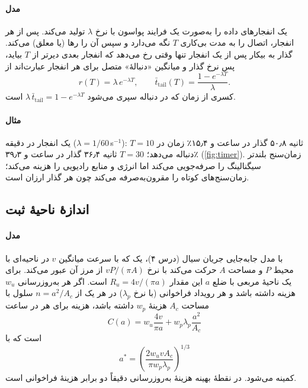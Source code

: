 \documentclass[11pt,a4paper]{article}
\begin{document}
\paragraph{مدل} یک  انفجارهای داده را به‌صورت یک فرایند پواسون با نرخ $\lambda$ تولید می‌کند. پس از هر انفجار،  اتصال را به مدت
بی‌کاری $T$ نگه می‌دارد و سپس آن را رها (یا معلق) می‌کند. گذار به بیکار پس از یک انفجار تنها وقتی رخ می‌دهد که انفجار بعدی دیرتر از $T$ بیاید،
پس نرخ گذار و میانگین «دنبالهٔ» متصل برای هر انفجار عبارت‌اند از
\begin{equation}\label{eq:timer}
  r(T) = \lambda\, e^{-\lambda T}, \qquad \bar{t}_{\mathrm{tail}}(T) = \frac{1 - e^{-\lambda T}}{\lambda} .
\end{equation}
کسری از زمان که در دنباله سپری می‌شود $\lambda\,\bar{t}_{\mathrm{tail}} = 1 - e^{-\lambda T}$ است.
\paragraph{مثال} یک انفجار در دقیقه ($\lambda = 1/60$\,s$^{-1}$): $T = 10$ ثانیه ۵۰٫۸ گذار در ساعت و ۱۵٫۴٪ زمان در دنباله می‌دهد؛ $T = 30$ ثانیه ۳۶٫۴
گذار در ساعت و ۳۹٫۳٪ (\cref{fig:timer}). زمان‌سنج بلندتر سیگنالینگ را صرفه‌جویی می‌کند اما انرژی  و منابع رادیویی را هزینه می‌کند؛
 زمان‌سنج‌های کوتاه را مقرون‌به‌صرفه می‌کند چون هر گذار ارزان است.

\begin{acnfigure}
  \caption{معاوضهٔ زمان‌سنج بی‌کاری برای یک انفجار در دقیقه (\cref{eq:timer}).}
  \label{fig:timer}
\end{acnfigure}

\subsection{اندازهٔ ناحیهٔ ثبت}\label{sec:ra}
\paragraph{مدل} با مدل جابه‌جایی جریان سیال (درس ۴)، یک  که با سرعت میانگین $v$ در ناحیه‌ای با محیط $P$ و مساحت $A$ حرکت می‌کند با نرخ
$vP/(\pi A)$ از مرز آن عبور می‌کند. برای یک ناحیهٔ مربعی با ضلع $a$ این مقدار $R_u = 4v/(\pi a)$ است. اگر هر به‌روزرسانی $w_u$ هزینه داشته باشد و هر
رویداد فراخوانی (با نرخ $\lambda_p$) در هر یک از $n = a^2/A_c$ سلول با مساحت $A_c$ هزینهٔ $w_p$ داشته باشد، هزینه برای هر  در ساعت
\begin{equation}\label{eq:racost}
  C(a) = w_u \frac{4v}{\pi a} + w_p \lambda_p \frac{a^2}{A_c}
\end{equation}
است که با
\begin{equation}\label{eq:raopt}
  a^{*} = \left( \frac{2 w_u v A_c}{\pi w_p \lambda_p} \right)^{1/3}
\end{equation}
کمینه می‌شود. در نقطهٔ بهینه هزینهٔ به‌روزرسانی دقیقاً دو برابر هزینهٔ فراخوانی است.
\end{document}
